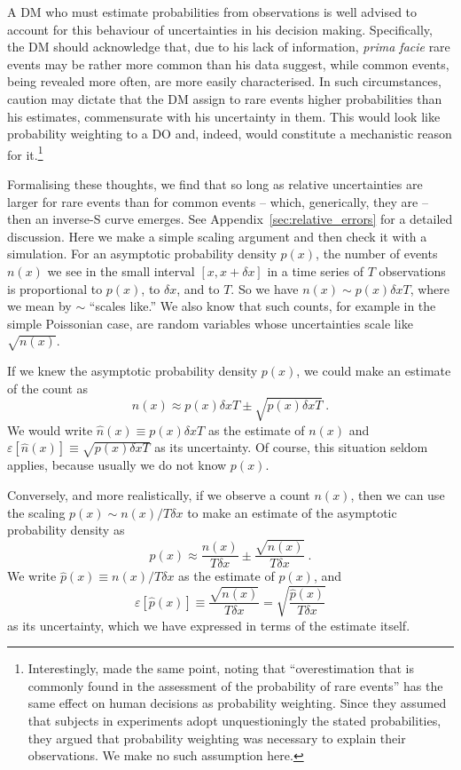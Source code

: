 \documentclass[a4paper, 12pt]{article}
\newcommand{\elabel}[1]{\label{eq:#1}}
\newcommand{\Appref}[1]{Appendix~\ref{sec:#1}}
\newcommand{\be}{\begin{equation}}
\newcommand{\ee}{\end{equation}}
\newcommand{\err}[1]{\varepsilon\left[#1\right]}
\newcommand{\phat}{\hat{p}}
\newcommand{\nhat}{\hat{n}}
\begin{document}
A DM who must estimate probabilities from observations is well advised to account for this behaviour of uncertainties in his decision making. Specifically, the DM should acknowledge that, due to his lack of information, \textit{prima facie} rare events may be rather more common than his data suggest, while common events, being revealed more often, are more easily characterised. In such circumstances, caution may dictate that the DM assign to rare events higher probabilities than his estimates, commensurate with his uncertainty in them. This would look like probability weighting to a DO and, indeed, would constitute a mechanistic reason for it.\footnote{Interestingly, \textcite[281]{KahnemanTversky1979} made the same point, noting that ``overestimation that is commonly found in the assessment of the probability of rare events'' has the same effect on human decisions as probability weighting. Since they assumed that subjects in experiments adopt unquestioningly the stated probabilities, they argued that probability weighting was necessary to explain their observations. We make no such assumption here.}

Formalising these thoughts, we find that so long as relative uncertainties are larger for rare events than for common events -- which, generically, they are -- then an inverse-S curve emerges. See \Appref{relative_errors} for a detailed discussion. Here we make a simple scaling argument and then check it with a simulation. For an asymptotic probability density $p(x)$, the number of events $n(x)$ we see in the small interval $[x, x+ \delta x]$ in a time series of $T$ observations is proportional to $p(x)$, to $\delta x$, and to $T$. So we have $n(x) \sim p(x) \delta x T$, where we mean by $\sim$ ``scales like.'' We also know that such counts, for example in the simple Poissonian case, are random variables whose uncertainties scale like $\sqrt{n(x)}$.

If we knew the asymptotic probability density $p(x)$, we could make an estimate of the count as
\be
n(x) \approx p(x) \delta x T \pm \sqrt{p(x) \delta x T} ~.
\elabel{count_est}
\ee
We would write $\nhat(x) \equiv p(x) \delta x T$ as the estimate of $n(x)$ and $\err{\nhat(x)} \equiv \sqrt{p(x) \delta x T}$ as its uncertainty. Of course, this situation seldom applies, because usually we do not know $p(x)$.

Conversely, and more realistically, if we observe a count $n(x)$, then we can use the scaling $ p(x) \sim n(x)/T\delta x$ to make an estimate of the asymptotic probability density as
\be
p(x) \approx \frac{n(x)}{T\delta x} \pm \frac{\sqrt{n(x)}}{T \delta x} ~.
\elabel{prob_est}
\ee
We write $\phat(x) \equiv n(x)/T\delta x$ as the estimate of $p(x)$, and
\be
\err{\phat(x)} \equiv \frac{\sqrt{n(x)}}{T \delta x} = \sqrt{\frac{\phat(x)}{T \delta x}}
\ee
as its uncertainty, which we have expressed in terms of the estimate itself.
\end{document}
